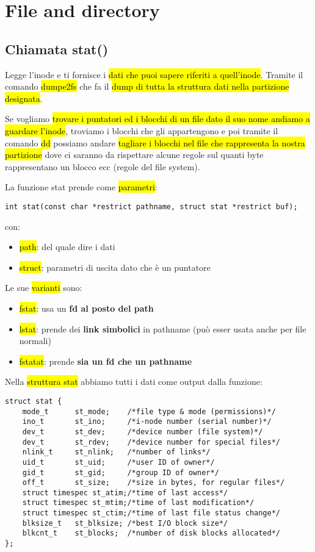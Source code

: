\newpage
\section{File and directory}

\subsection{Chiamata stat()}

Legge l'inode e ti fornisce i \hl{dati che puoi sapere riferiti a quell'inode}. Tramite il comando \hl{dumpe2fs} che fa il \hl{dump di tutta la struttura dati nella partizione designata}.

Se vogliamo \hl{trovare i puntatori ed i blocchi di un file dato il suo nome andiamo a guardare l'inode}, troviamo i blocchi che gli appartengono e poi tramite il comando \hl{dd} possiamo andare \hl{tagliare i blocchi nel file che rappresenta la nostra partizione} dove ci saranno da rispettare alcune regole sul quanti byte rappresentano un blocco ecc (regole del file system).

La funzione stat prende come \hl{parametri}:

\begin{lstlisting}
int stat(const char *restrict pathname, struct stat *restrict buf);
\end{lstlisting}

con:

\begin{itemize}
    \item \hl{path}: del quale dire i dati
    \item \hl{struct}: parametri di uscita dato che è un puntatore
\end{itemize}


Le sue \hl{varianti} sono:

\begin{itemize}
    \item \hl{fstat}: usa un \textbf{fd al posto del path}
    \item \hl{lstat}: prende dei \textbf{link simbolici} in pathname (può esser usata anche per file normali)
    \item \hl{fstatat}: prende \textbf{sia un fd che un pathname}
\end{itemize}

Nella \hl{struttura stat} abbiamo tutti i dati come output dalla funzione:

\begin{lstlisting}
struct stat {
	mode_t		st_mode;	/*file type & mode (permissions)*/
	ino_t		st_ino;		/*i-node number (serial number)*/
	dev_t		st_dev;		/*device number (file system)*/
	dev_t		st_rdev;	/*device number for special files*/
	nlink_t		st_nlink;	/*number of links*/
	uid_t		st_uid;		/*user ID of owner*/
	gid_t		st_gid;		/*group ID of owner*/
	off_t		st_size;	/*size in bytes, for regular files*/
	struct timespec st_atim;/*time of last access*/
	struct timespec st_mtim;/*time of last modification*/
	struct timespec st_ctim;/*time of last file status change*/
	blksize_t	st_blksize;	/*best I/O block size*/
	blkcnt_t	st_blocks;	/*number of disk blocks allocated*/
};
\end{lstlisting}

